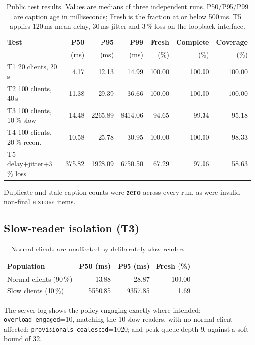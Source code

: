 \documentclass[11pt,a4paper]{article}
\begin{document}
\begin{table}[h]
\centering\small
\begin{tabular}{@{}lrrrrrr@{}}
\toprule
\textbf{Test} & \textbf{P50} & \textbf{P95} & \textbf{P99} &
\textbf{Fresh} & \textbf{Complete} & \textbf{Coverage} \\
 & (ms) & (ms) & (ms) & (\%) & (\%) & (\%) \\
\midrule
T1 20 clients, 20\,s          & 4.17 & 12.13 & 14.99 & 100.00 & 100.00 & 100.00 \\
T2 100 clients, 40\,s         & 11.38 & 29.39 & 36.66 & 100.00 & 100.00 & 100.00 \\
T3 100 clients, 10\,\% slow   & 14.48 & 2265.89 & 8414.06 & 94.65 & 99.34 & 95.18 \\
T4 100 clients, 20\,\% recon. & 10.58 & 25.78 & 30.95 & 100.00 & 100.00 & 98.33 \\
T5 delay+jitter+3\,\% loss    & 375.82 & 1928.09 & 6750.50 & 67.29 & 97.06 & 58.63 \\
\bottomrule
\end{tabular}
\caption{Public test results. Values are medians of three independent runs.
P50/P95/P99 are caption age in milliseconds; Fresh is the fraction at or
below 500\,ms. T5 applies 120\,ms mean delay, 30\,ms jitter and 3\,\% loss
on the loopback interface.}
\end{table}

Duplicate and stale caption counts were \textbf{zero} across every run,
as were invalid non-final \textsc{history} items.

\subsection{Slow-reader isolation (T3)}

\begin{table}[h]
\centering\small
\begin{tabular}{@{}lrrr@{}}
\toprule
\textbf{Population} & \textbf{P50 (ms)} & \textbf{P95 (ms)} & \textbf{Fresh (\%)} \\
\midrule
Normal clients (90\,\%) & 13.88    & 28.87   & 100.00 \\
Slow clients (10\,\%)   & 5550.85 & 9357.85 & 1.69 \\
\bottomrule
\end{tabular}
\caption{Normal clients are unaffected by deliberately slow readers.}
\end{table}

The server log shows the policy engaging exactly where intended:
\texttt{overload\_engaged}=10, matching the 10 slow readers, with no normal
client affected; \texttt{provisionals\_coalesced}=1020; and peak queue depth
9, against a soft bound of 32.
\end{document}
